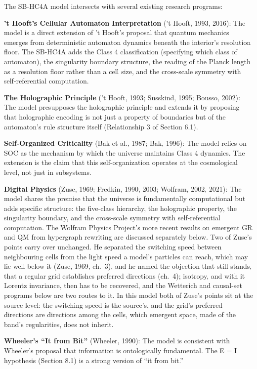 \documentclass[
]{article}
\begin{document}
The SB-HC4A model intersects with several existing research programs:

\textbf{'t Hooft's Cellular Automaton Interpretation} ('t Hooft, 1993,
2016): The model is a direct extension of 't Hooft's proposal that
quantum mechanics emerges from deterministic automaton dynamics beneath
the interior's resolution floor. The SB-HC4A adds the Class 4
classification (specifying which class of automaton), the singularity
boundary structure, the reading of the Planck length as a resolution
floor rather than a cell size, and the cross-scale symmetry with
self-referential computation.

\textbf{The Holographic Principle} ('t Hooft, 1993; Susskind, 1995;
Bousso, 2002): The model presupposes the holographic principle and
extends it by proposing that holographic encoding is not just a property
of boundaries but of the automaton's rule structure itself (Relationship
3 of Section 6.1).

\textbf{Self-Organized Criticality} (Bak et al., 1987; Bak, 1996): The
model relies on SOC as the mechanism by which the universe maintains
Class 4 dynamics. The extension is the claim that this self-organization
operates at the cosmological level, not just in subsystems.

\textbf{Digital Physics} (Zuse, 1969; Fredkin, 1990, 2003; Wolfram,
2002, 2021): The model shares the premise that the universe is
fundamentally computational but adds specific structure: the five-class
hierarchy, the holographic property, the singularity boundary, and the
cross-scale symmetry with self-referential computation. The Wolfram
Physics Project's more recent results on emergent GR and QM from
hypergraph rewriting are discussed separately below. Two of Zuse's
points carry over unchanged. He separated the switching speed between
neighbouring cells from the light speed a model's particles can reach,
which may lie well below it (Zuse, 1969, ch.~3), and he named the
objection that still stands, that a regular grid establishes preferred
directions (ch.~4); isotropy, and with it Lorentz invariance, then has
to be recovered, and the Wetterich and causal-set programs below are two
routes to it. In this model both of Zuse's points sit at the source
level: the switching speed is the source's, and the grid's preferred
directions are directions among the cells, which emergent space, made of
the band's regularities, does not inherit.

\textbf{Wheeler's ``It from Bit''} (Wheeler, 1990): The model is
consistent with Wheeler's proposal that information is ontologically
fundamental. The E = I hypothesis (Section 8.1) is a strong version of
``it from bit.''
\end{document}
